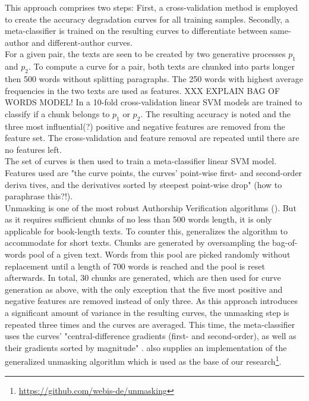 This approach comprises two steps: First, a cross-validation method is employed to create the accuracy degradation curves for all training samples.
Secondly, a meta-classifier is trained on the resulting curves to differentiate between same-author and different-author curves.\\
For a given pair, the texts are seen to be created by two generative processes $p_1$ and $p_2$.
To compute a curve for a pair, both texts are chunked into parts longer then 500 words without splitting paragraphs.
The 250 words with highest average frequencies in the two texts are used as features.
XXX EXPLAIN BAG OF WORDS MODEL!
In a 10-fold cross-validation linear SVM models are trained to classify if a chunk belongs to $p_1$ or $p_2$.
The resulting accuracy is noted and the three most influential(?) positive and negative features are removed from the feature set.
The cross-validation and feature removal are repeated until there are no features left.\\
The set of curves is then used to train a meta-classifier linear SVM model.
Features used are "the curve points, the curves' point-wise first- and second-order deriva
tives, and the derivatives sorted by steepest point-wise drop" \cite{bevendorff2019unmaskingShortTexts}(how to paraphrase this?!).\\
Unmasking is one of the most robust Authorship Verification algorithms (\cite{bevendorff2019unmaskingShortTexts}).
But as it requires sufficient chunks of no less than 500 words length, it is only applicable for book-length texts.
To counter this, \cite{bevendorff2019unmaskingShortTexts} generalizes the algorithm to accommodate for short texts.
Chunks are generated by oversampling the bag-of-words pool of a given text.
Words from this pool are picked randomly without replacement until a length of 700 words is reached and the pool is reset afterwards.
In total, 30 chunks are generated, which are then used for curve generation as above, with the only exception that the five most positive and negative features are removed instead of only three.
As this approach introduces a significant amount of variance in the resulting curves, the unmasking step is repeated three times and the curves are averaged.
This time, the meta-classifier uses the curves' "central-difference gradients (first- and second-order), as well as their gradients sorted by magnitude" \cite{bevendorff2019unmaskingShortTexts}.
\cite{bevendorff2019unmaskingShortTexts} also supplies an implementation of the generalized unmasking algorithm which is used as the base of our research\footnote{\url{https://github.com/webis-de/unmasking}}.\\


